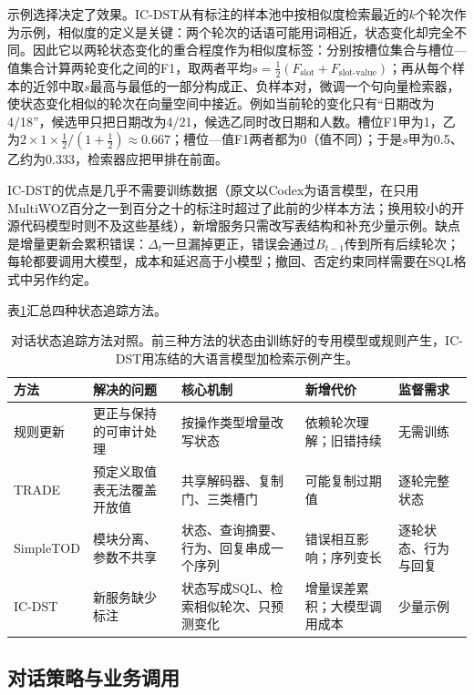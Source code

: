 示例选择决定了效果。IC-DST从有标注的样本池中按相似度检索最近的$k$个轮次作为示例，相似度的定义是关键：两个轮次的话语可能用词相近，状态变化却完全不同。因此它以两轮状态变化的重合程度作为相似度标签：分别按槽位集合与槽位—值集合计算两轮变化之间的F1，取两者平均$s=\frac12(F_{\mathrm{slot}}+F_{\mathrm{slot\text{-}value}})$；再从每个样本的近邻中取$s$最高与最低的一部分构成正、负样本对，微调一个句向量检索器，使状态变化相似的轮次在向量空间中接近。例如当前轮的变化只有“日期改为4/18”，候选甲只把日期改为4/21，候选乙同时改日期和人数。槽位F1甲为1，乙为$2\times1\times\frac12/(1+\frac12)\approx0.667$；槽位—值F1两者都为0（值不同）；于是$s$甲为0.5、乙约为0.333，检索器应把甲排在前面。

IC-DST的优点是几乎不需要训练数据（原文以Codex为语言模型，在只用MultiWOZ百分之一到百分之十的标注时超过了此前的少样本方法；换用较小的开源代码模型时则不及这些基线），新增服务只需改写表结构和补充少量示例。缺点是增量更新会累积错误：$\Delta_t$一旦漏掉更正，错误会通过$B_{t-1}$传到所有后续轮次；每轮都要调用大模型，成本和延迟高于小模型；撤回、否定约束同样需要在SQL格式中另作约定。

表\ref{tab:nlp-dialogue-dst-methods}汇总四种状态追踪方法。

\begin{table}[htbp]
\centering
\small
\begin{tabular}{p{18mm}p{30mm}p{36mm}p{34mm}p{26mm}}
\toprule
方法 & 解决的问题 & 核心机制 & 新增代价 & 监督需求 \\
\midrule
规则更新 & 更正与保持的可审计处理 & 按操作类型增量改写状态 & 依赖轮次理解；旧错持续 & 无需训练 \\
TRADE & 预定义取值表无法覆盖开放值 & 共享解码器、复制门、三类槽门 & 可能复制过期值 & 逐轮完整状态 \\
SimpleTOD & 模块分离、参数不共享 & 状态、查询摘要、行为、回复串成一个序列 & 错误相互影响；序列变长 & 逐轮状态、行为与回复 \\
IC-DST & 新服务缺少标注 & 状态写成SQL、检索相似轮次、只预测变化 & 增量误差累积；大模型调用成本 & 少量示例 \\
\bottomrule
\end{tabular}
\caption{对话状态追踪方法对照。前三种方法的状态由训练好的专用模型或规则产生，IC-DST用冻结的大语言模型加检索示例产生。}
\label{tab:nlp-dialogue-dst-methods}
\end{table}

\subsection{对话策略与业务调用}
\label{sec:nlp-dialogue-action}


